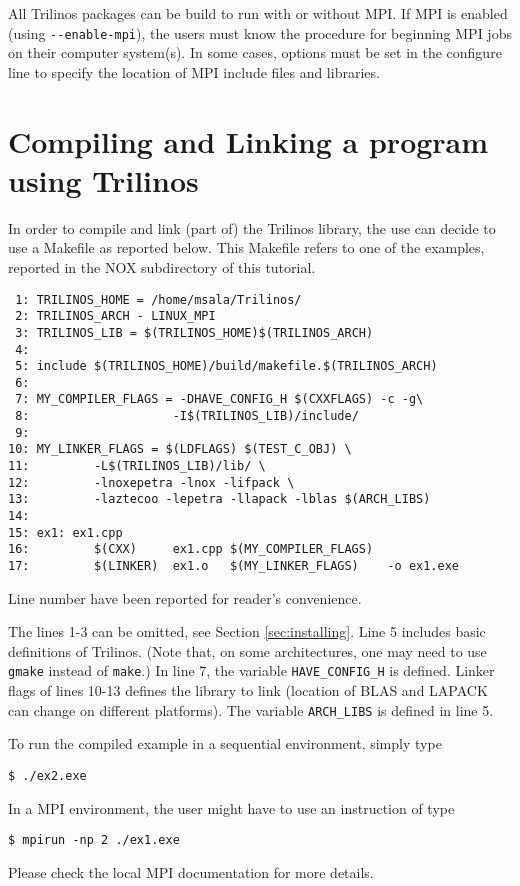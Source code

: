 \begin{remark}
  All Trilinos packages can be build to run with or without MPI. If MPI
  is enabled (using \verb!--enable-mpi!), the users must know the
  procedure for beginning MPI jobs on their computer system(s). In some
  cases, options must be set in the configure line to specify the
  location of MPI include files and libraries.
\end{remark}


\section{Compiling and Linking a program using Trilinos}
\label{sec:intro_compiling}

In order to compile and link (part of) the Trilinos library, the use can
decide to use a Makefile as reported below. This Makefile refers to one
of the examples, reported in the NOX subdirectory of this tutorial.
\begin{verbatim}
 1: TRILINOS_HOME = /home/msala/Trilinos/
 2: TRILINOS_ARCH - LINUX_MPI
 3: TRILINOS_LIB = $(TRILINOS_HOME)$(TRILINOS_ARCH)
 4: 
 5: include $(TRILINOS_HOME)/build/makefile.$(TRILINOS_ARCH)
 6: 
 7: MY_COMPILER_FLAGS = -DHAVE_CONFIG_H $(CXXFLAGS) -c -g\
 8:                    -I$(TRILINOS_LIB)/include/
 9:
10: MY_LINKER_FLAGS = $(LDFLAGS) $(TEST_C_OBJ) \
11:         -L$(TRILINOS_LIB)/lib/ \
12:         -lnoxepetra -lnox -lifpack \
13:         -laztecoo -lepetra -llapack -lblas $(ARCH_LIBS)
14:
15: ex1: ex1.cpp
16:         $(CXX)     ex1.cpp $(MY_COMPILER_FLAGS)
17:         $(LINKER)  ex1.o   $(MY_LINKER_FLAGS)    -o ex1.exe
\end{verbatim}

Line number have been reported for  reader's convenience. 

The lines 1-3 can be omitted, see Section \ref{sec:installing}.  Line 5
includes basic definitions of Trilinos. (Note that, on some
architectures, one may need to use \verb!gmake! instead of \verb!make!.)
In line 7, the variable \verb!HAVE_CONFIG_H! is defined. Linker flags of
lines 10-13 defines the library to link (location of BLAS and LAPACK can
change on different platforms). The variable \verb!ARCH_LIBS! is defined
in line 5.

To run the compiled example in a sequential environment, simply type
\begin{verbatim}
$ ./ex2.exe
\end{verbatim}
In a MPI environment, the user might have to
use an instruction of type
\begin{verbatim}
$ mpirun -np 2 ./ex1.exe
\end{verbatim}
Please check the local MPI documentation for more details. 

